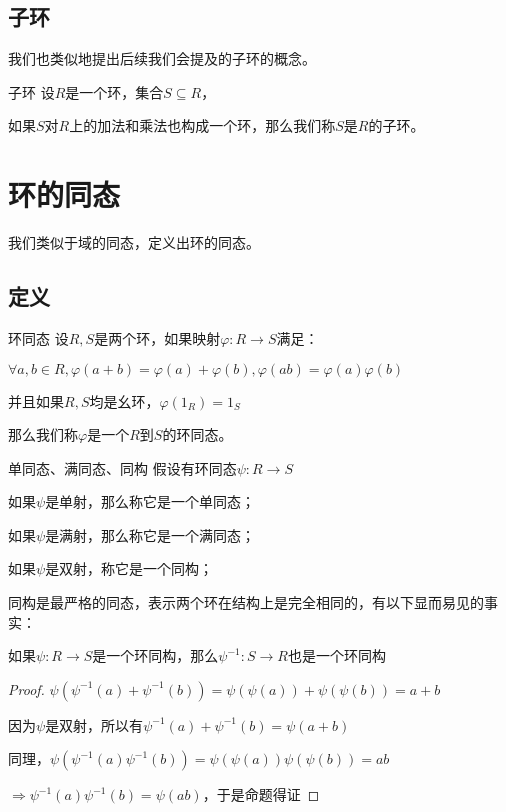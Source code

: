 \documentclass[12pt, a4paper, oneside, UTF8]{ctexbook}
\begin{document}
		\subsection{子环}
			我们也类似地提出后续我们会提及的子环的概念。
			\begin{defn}{子环}{}
				设$R$是一个环，集合$S \subseteq R$，
				
				如果$S$对$R$上的加法和乘法也构成一个环，那么我们称$S$是$R$的子环。
			\end{defn}
	\section{环的同态}
		我们类似于域的同态，定义出环的同态。
		\subsection{定义}
			\begin{defn}{环同态}{}
				设$R,S$是两个环，如果映射$\varphi : R \rightarrow S$满足：

				$\forall a,b \in R,\varphi (a+b)=\varphi (a)+\varphi (b),\varphi (ab)=\varphi (a)\varphi (b)$

				并且如果$R,S$均是幺环，$\varphi (1_R)=1_S$
				
				那么我们称$\varphi $是一个$R$到$S$的环同态。
			\end{defn}
			\begin{defn}{单同态、满同态、同构}{}
				假设有环同态$\psi :R \rightarrow S$

				如果$\psi $是单射，那么称它是一个单同态；

				如果$\psi $是满射，那么称它是一个满同态；

				如果$\psi $是双射，称它是一个同构；
			\end{defn}
			同构是最严格的同态，表示两个环在结构上是完全相同的，有以下显而易见的事实：
			\begin{proposition}
				如果$\psi : R \rightarrow S$是一个环同构，那么$\psi^{-1} : S \rightarrow R$也是一个环同构
			\end{proposition}
			\begin{proof}
				$\psi \left(\psi^{-1} (a)+\psi^{-1} (b)\right)=\psi \left(\psi (a)\right)+\psi \left(\psi (b)\right)=a+b$

				因为$\psi $是双射，所以有$\psi^{-1} (a)+\psi^{-1} (b)=\psi (a+b)$

				同理，$\psi \left(\psi^{-1} (a)\psi^{-1} (b)\right)=\psi \left(\psi (a)\right)\psi \left(\psi (b)\right)=ab$

				$\Rightarrow \psi^{-1} (a)\psi^{-1} (b)=\psi (ab)$，于是命题得证
			\end{proof}
\end{document}
